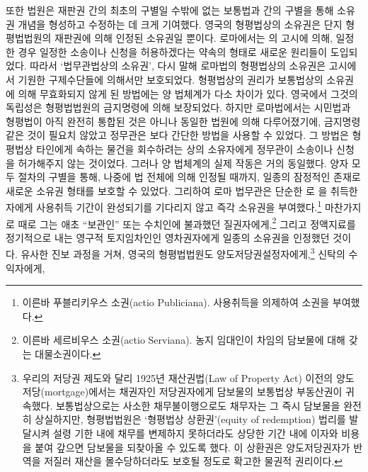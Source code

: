 또한 법원은
재판권 간의 최초의 구별일 수밖에 없는
보통법과  간의 구별을 통해
소유권 개념을 형성하고 수정하는 데
크게 기여했다.
영국의 형평법상의 소유권은 단지
형평법법원의 재판권에 의해 인정된 소유권일 뿐이다.
로마에서는
의 고시에 의해,
일정한 경우 일정한 소송이나 신청을 허용하겠다는 약속의 형태로
새로운 원리들이 도입되었다.
따라서 `법무관법상의 소유권',
다시 말해 로마법의 형평법상의 소유권은
고시에서 기원한 구제수단들에 의해서만 보호되었다.
형평법상의 권리가 보통법상의 소유권에 의해
무효화되지 않게 된 방법에는 양 법체계가 다소 차이가 있다.
영국에서 그것의 독립성은 형평법법원의
금지명령에 의해 보장되었다.
하지만 로마법에서는
시민법과 형평법이
아직 완전히 통합된 것은 아니나
동일한 법원에 의해 다루어졌기에,
금지명령 같은 것이 필요치 않았고
정무관은 보다 간단한 방법을 사용할 수 있었다.
그 방법은 형평법상 타인에게 속하는 물건을 회수하려는
상의 소유자에게 정무관이 소송이나 신청을 허가해주지 않는 것이었다.
그러나 양 법체계의 실제 작동은 거의 동일했다.
양자 모두 절차의 구별을 통해,
나중에 법 전체에 의해 인정될 때까지,
일종의 잠정적인 존재로 새로운 소유권 형태를
보호할 수 있었다.
그리하여
로마 법무관은
단순한 로 을 취득한 자에게
사용취득 기간이 완성되기를 기다리지 않고
즉각 소유권을 부여했다.\footnote{%
  이른바 푸블리키우스 소권(actio Publiciana).
  사용취득을 의제하여 소권을 부여했다. }
마찬가지로 때로 그는
애초 ``보관인'' 또는
수치인에 불과했던
질권자에게,\footnote{%
  이른바 세르비우스 소권(actio Serviana).
  농지 임대인이 차임의 담보물에 대해 갖는 대물소권이다.
  }
그리고 정액지료를 정기적으로 내는 영구적 토지임차인인
영차권자에게
일종의 소유권을 인정했던 것이다.
유사한 진보 과정을 거쳐,
영국의 형평법법원도
양도저당권설정자에게,\footnote{%
  우리의 저당권 제도와 달리
  1925년 재산권법(Law of Property Act) 이전의 양도저당(mortgage)에서는
  채권자인 저당권자에게 담보물의 보통법상 부동산권이 귀속했다.
  보통법상으로는 사소한 채무불이행으로도
  채무자는 그 즉시 담보물을 완전히 상실하지만,
  형평법법원은
  `형평법상 상환권'(equity of redemption) 법리를 발달시켜
  설령 기한 내에 채무를 변제하지 못하더라도
  상당한 기간 내에 이자와 비용을 붙여 갚으면
  담보물을 되찾아올 수 있도록 했다.
  이 상환권은 양도저당권자가 반역을 저질러 재산을 몰수당하더라도
  보호될 정도로 확고한 물권적 권리이다.
  }
신탁의 수익자에게,
